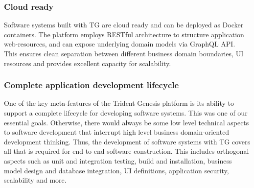 \documentclass[a4paper,10pt,twocolumn,oneside,openright,final]{memoir}
\begin{document}
    
    
\subsubsection*{Cloud ready}
	Software systems built with TG are cloud ready and can be deployed as Docker containers.
	The platform employs RESTful architecture to structure application web-resources, and can expose underlying domain models via GraphQL API.
	This ensures clean separation between different business domain boundaries, UI resources and provides excellent capacity for scalability.

\subsubsection*{Complete application development lifecycle}
	One of the key meta-features of the Trident Genesis platform is its ability to support a complete lifecycle for developing software systems.
	This was one of our essential goals.
	Otherwise, there would always be some low level technical aspects to software development that interrupt high level business domain-oriented development thinking.
	Thus, the development of software systems with TG covers all that is required for end-to-end software construction.
	This includes orthogonal aspects such as unit and integration testing, build and installation, business model design and database integration, UI definitions, application security, scalability and more.
\end{document}
